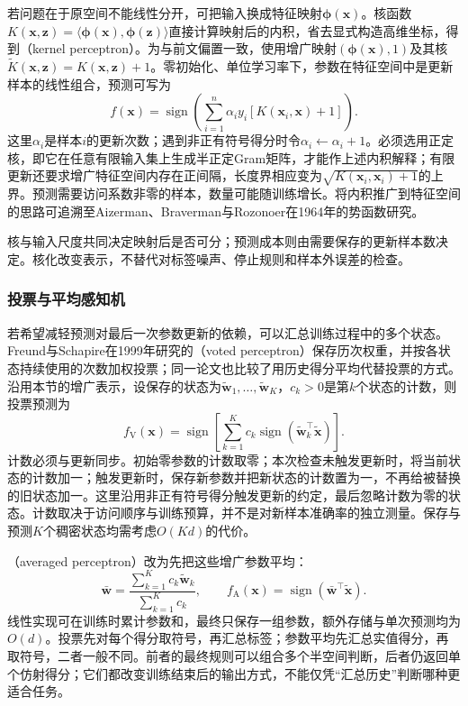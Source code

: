 若问题在于原空间不能线性分开，可把输入换成特征映射$\bm{\phi}(\bm{x})$。核函数$K(\bm{x},\bm{z})=\langle\bm{\phi}(\bm{x}),\bm{\phi}(\bm{z})\rangle$直接计算映射后的内积，省去显式构造高维坐标，得到（kernel perceptron）。为与前文偏置一致，使用增广映射$(\bm{\phi}(\bm{x}),1)$及其核$\tilde K(\bm{x},\bm{z})=K(\bm{x},\bm{z})+1$。零初始化、单位学习率下，参数在特征空间中是更新样本的线性组合，预测可写为
\begin{equation}
  \label{eq:classification-kernel-perceptron}
  f(\bm{x})=\operatorname{sign}
    \left(\sum_{i=1}^{n}\alpha_i y_i
      [K(\bm{x}_i,\bm{x})+1]\right).
\end{equation}
这里$\alpha_i$是样本$i$的更新次数；遇到非正有符号得分时令$\alpha_i\leftarrow\alpha_i+1$。必须选用正定核，即它在任意有限输入集上生成半正定Gram矩阵，才能作上述内积解释；有限更新还要求增广特征空间内存在正间隔，长度界相应变为$\sqrt{K(\bm{x}_i,\bm{x}_i)+1}$的上界。预测需要访问系数非零的样本，数量可能随训练增长。将内积推广到特征空间的思路可追溯至Aizerman、Braverman与Rozonoer在1964年的势函数研究。

核与输入尺度共同决定映射后是否可分；预测成本则由需要保存的更新样本数决定。核化改变表示，不替代对标签噪声、停止规则和样本外误差的检查。

\subsubsection{投票与平均感知机}

若希望减轻预测对最后一次参数更新的依赖，可以汇总训练过程中的多个状态。Freund与Schapire在1999年研究的（voted perceptron）保存历次权重，并按各状态持续使用的次数加权投票；同一论文也比较了用历史得分平均代替投票的方式。沿用本节的增广表示，设保存的状态为$\tilde{\bm w}_1,\ldots,\tilde{\bm w}_K$，$c_k>0$是第$k$个状态的计数，则投票预测为
\begin{equation}
  f_{\mathrm V}(\bm x)
  =\operatorname{sign}\!\left[
    \sum_{k=1}^{K}c_k\operatorname{sign}
       (\tilde{\bm w}_k^\top\tilde{\bm x})\right].
  \label{eq:classification-voted-perceptron}
\end{equation}
计数必须与更新同步。初始零参数的计数取零；本次检查未触发更新时，将当前状态的计数加一；触发更新时，保存新参数并把新状态的计数置为一，不再给被替换的旧状态加一。这里沿用非正有符号得分触发更新的约定，最后忽略计数为零的状态。计数取决于访问顺序与训练预算，并不是对新样本准确率的独立测量。保存与预测$K$个稠密状态均需考虑$O(Kd)$的代价。

（averaged perceptron）改为先把这些增广参数平均：
\[
  \bar{\bm w}=\frac{\sum_{k=1}^{K}c_k\tilde{\bm w}_k}
                        {\sum_{k=1}^{K}c_k},
  \qquad
  f_{\mathrm A}(\bm x)=\operatorname{sign}
                    (\bar{\bm w}^\top\tilde{\bm x}).
\]
线性实现可在训练时累计参数和，最终只保存一组参数，额外存储与单次预测均为$O(d)$。投票先对每个得分取符号，再汇总标签；参数平均先汇总实值得分，再取符号，二者一般不同。前者的最终规则可以组合多个半空间判断，后者仍返回单个仿射得分；它们都改变训练结束后的输出方式，不能仅凭“汇总历史”判断哪种更适合任务。

